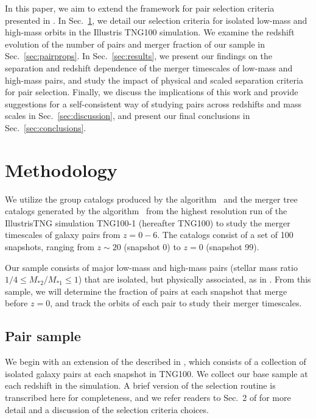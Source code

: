 \documentclass[twocolumn,linenumbers]{aastex631}
\newcommand{\chambe}{\citet{Chamberlain2024}}
\begin{document}
In this paper, we aim to extend the framework for pair selection criteria presented in \chambe{}.
In Sec.~\ref{sec:methods}, we detail our selection criteria for isolated low-mass and high-mass orbits in the Illustris TNG100 simulation. 
We examine the redshift evolution of the number of pairs and merger fraction of our sample in Sec.~\ref{sec:pairprops}.
In Sec.~\ref{sec:results}, we present our findings on the separation and redshift dependence of the merger timescales of low-mass and high-mass pairs, and study the impact of physical and scaled separation criteria for pair selection. 
Finally, we discuss the implications of this work and provide suggestions for a self-consistent way of studying pairs across redshifts and mass scales in Sec.~\ref{sec:discussion}, and present our final conclusions in Sec.~\ref{sec:conclusions}.



\section{Methodology} \label{sec:methods}
We utilize the group catalogs produced by the \subfind{} algorithm~\citep{Springel2001b,Dolag2009} and the merger tree catalogs generated by the \sublink{} algorithm~\citep{RG2015} from the highest resolution run of the IllustrisTNG simulation TNG100-1 (hereafter TNG100) to study the merger timescales of galaxy pairs from $z=0-6$.
The catalogs consist of a set of 100 snapshots, ranging from $z\sim20$ (snapshot 0) to $z=0$ (snapshot 99).

Our sample consists of major low-mass and high-mass pairs (stellar mass ratio $1/4 \leq M_{*2}/M_{*1}\leq 1$) that are isolated, but physically associated, as in \citet{Chamberlain2024}.
From this sample, we will determine the fraction of pairs at each snapshot that merge before $z=0$, and track the orbits of each pair to study their merger timescales.

\subsection{Pair sample}
We begin with an extension of the \paircat{} described in \chambe{}, which consists of a collection of isolated galaxy pairs at each snapshot in TNG100. 
We collect our base sample at each redshift in the simulation. 
A brief version of the selection routine is transcribed here for completeness, and we refer readers to Sec.~2 of \chambe{} for more detail and a discussion of the selection criteria choices. 
\end{document}
